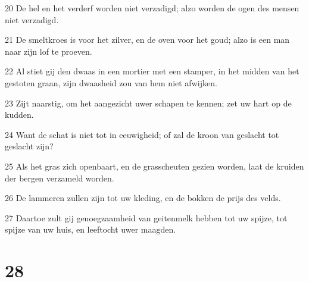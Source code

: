\par 20 De hel en het verderf worden niet verzadigd; alzo worden de ogen des mensen niet verzadigd.
\par 21 De smeltkroes is voor het zilver, en de oven voor het goud; alzo is een man naar zijn lof te proeven.
\par 22 Al stiet gij den dwaas in een mortier met een stamper, in het midden van het gestoten graan, zijn dwaasheid zou van hem niet afwijken.
\par 23 Zijt naarstig, om het aangezicht uwer schapen te kennen; zet uw hart op de kudden.
\par 24 Want de schat is niet tot in eeuwigheid; of zal de kroon van geslacht tot geslacht zijn?
\par 25 Als het gras zich openbaart, en de grasscheuten gezien worden, laat de kruiden der bergen verzameld worden.
\par 26 De lammeren zullen zijn tot uw kleding, en de bokken de prijs des velds.
\par 27 Daartoe zult gij genoegzaamheid van geitenmelk hebben tot uw spijze, tot spijze van uw huis, en leeftocht uwer maagden.

\chapter{28}

